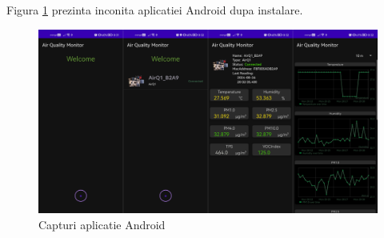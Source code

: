 Figura \ref{fig:iu_android_screens} prezinta inconita aplicatiei Android dupa instalare.
\begin{figure}[H]
    \centering
    \includegraphics[scale=0.12]{figs/iu_android_screens.png}
    \caption{Capturi aplicatie Android}
    \label{fig:iu_android_screens}
\end{figure}